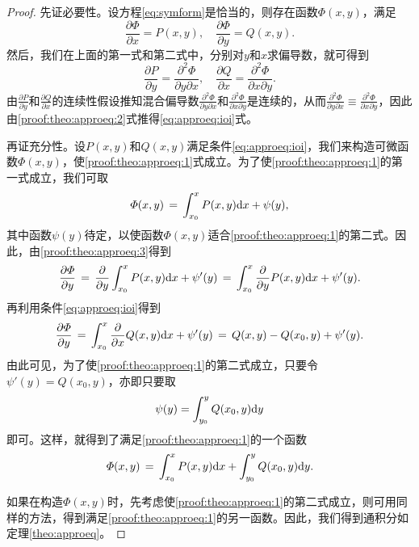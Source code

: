 \begin{proof}
先证必要性。设方程\eqref{eq:symform}是恰当的，则存在函数$\varPhi(x,y)$，满足
\begin{equation}\label{proof:theo:approeq:1}
\frac{\partial\varPhi}{\partial x}=P(x,y),\quad\frac{\partial\varPhi}{\partial y}=Q(x,y).
\end{equation}
然后，我们在上面的第一式和第二式中，分别对$y$和$x$求偏导数，就可得到
\begin{equation}\label{proof:theo:approeq:2}
\frac{\partial P}{\partial y}=\frac{\partial^2\varPhi}{\partial y\partial x},\quad\frac{\partial Q}{\partial x}=\frac{\partial^2\varPhi}{\partial x\partial y}.
\end{equation}
由$\frac{\partial P}{\partial y}$和$\frac{\partial Q}{\partial x}$的连续性假设推知混合偏导数$\frac{\partial^2\varPhi}{\partial y\partial x}$和$\frac{\partial^2\varPhi}{\partial x\partial y}$是连续的，从而$\frac{\partial^2\varPhi}{\partial y\partial x}\equiv\frac{\partial^2\varPhi}{\partial x\partial y}$，因此由\eqref{proof:theo:approeq:2}式推得\eqref{eq:approeq:ioi}式。\par
再证充分性。设$P(x,y)$和$Q(x,y)$满足条件\eqref{eq:approeq:ioi}，我们来构造可微函数$\varPhi(x,y)$，使\eqref{proof:theo:approeq:1}式成立。为了使\eqref{proof:theo:approeq:1}的第一式成立，我们可取
\begin{equation}\label{proof:theo:approeq:3}
\varPhi(x,y)\,=\,\int_{x_0}^{x}P(x,y)\mathrm{d} x+\psi(y),
\end{equation}
其中函数$\psi(y)$待定，以使函数$\varPhi(x,y)$适合\eqref{proof:theo:approeq:1}的第二式。因此，由\eqref{proof:theo:approeq:3}得到
$$\frac{\partial{}\varPhi}{\partial{}y}\,=\,\frac{\partial{}}{\partial{}y}\int_{x_0}^{x}P(x,y)\mathrm{d} x+\psi'(y)\,=\,\int_{x_0}^x\frac{\partial{}}{\partial{}y}P(x,y)\mathrm{d} x+\psi'(y).$$
再利用条件\eqref{eq:approeq:ioi}得到
$$\frac{\partial{}\varPhi}{\partial{}y}\,=\,\int_{x_0}^x\frac{\partial{}}{\partial{}x}Q(x,y)\mathrm{d} x+\psi'(y)\,=\,Q(x,y)-Q(x_0,y)+\psi'(y).$$
由此可见，为了使\eqref{proof:theo:approeq:1}的第二式成立，只要令$\psi'(y)=Q(x_0,y)$，亦即只要取$$\psi(y)=\int_{y_0}^yQ(x_0,y)\mathrm{d} y$$即可。这样，就得到了满足\eqref{proof:theo:approeq:1}的一个函数$$\varPhi(x,y)\,=\,\int_{x_0}^xP(x,y)\mathrm{d} x+\int_{y_0}^yQ(x_0,y)\mathrm{d} y.$$\par
如果在构造$\varPhi(x,y)$时，先考虑使\eqref{proof:theo:approeq:1}的第二式成立，则可用同样的方法，得到满足\eqref{proof:theo:approeq:1}的另一函数。因此，我们得到通积分如定理\ref{theo:approeq}。
\end{proof}

